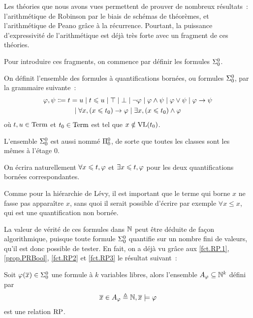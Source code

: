 Les théories que nous avons vues permettent de prouver de nombreux résultats~:
l'arithmétique de Robinson par le biais de schémas de théorèmes, et
l'arithmétique de Peano grâce à la récurrence. Pourtant, la puissance
d'expressivité de l'arithmétique est déjà très forte avec un fragment de ces
théories.

Pour introduire ces fragments, on commence par définir les formules
$\Sigma^0_{0}$.

\begin{definition}\label{def.Sigma0}
  On définit l'ensemble des formules à quantifications bornées, ou formules
  $\Sigma^0_{0}$, par la grammaire suivante~:
  \begin{multline*}
    \varFF,\varFP \inddefeq t = u \mid t \leq u \mid \top\mid \bot
    \mid \lnot \varFF
    \mid \varFF \land \varFP \mid \varFF \lor \varFP \mid \varFF \to \varFP\\
    \mid \forall x, (x \leq t_0) \to \varFF \mid
    \exists x, (x \leq t_0) \land \varFF
  \end{multline*}
  où $t,u \in \operatorname{Term}$ et $t_0\in \operatorname{Term}$ est tel que $x \notin \operatorname{VL}(t_0)$.

  L'ensemble $\Sigma^0_{0}$ est aussi nommé $\Pi^0_{0}$, de sorte que
  toutes les classes sont les mêmes à l'étage $0$.
\end{definition}

\begin{notation}
  On écrira naturellement $\forall x\leqslant t,\varphi$ et $\exists x\leqslant t,\varphi$
  pour les deux quantifications bornées correspondantes.
\end{notation}

\begin{remark}
  Comme pour la hiérarchie de Lévy, il est important que le terme
  qui borne $x$ ne fasse pas apparaître $x$, sans quoi il serait possible
  d'écrire par exemple $\forall x \leq x$, qui est une quantification non
  bornée.
\end{remark}

La valeur de vérité de ces formules dans $\mathbb N$ peut être déduite de façon
algorithmique, puisque toute formule $\Sigma^0_{0}$ quantifie sur un nombre
fini de valeurs, qu'il est donc possible de tester. En fait, on a déjà vu grâce
aux \cref{fct.RP.1}, \ref{prop.PRBool}, \ref{fct.RP2} et \ref{fct.RP3}
le résultat suivant~:

\begin{proposition}
  Soit $\varphi(\overline{x})\in \Sigma^0_{0}$ une formule à $k$ variables libres,
  alors l'ensemble $A_{\varphi}\subseteq \mathbb N^k$ défini par
  \[\overline{x} \in A_{\varphi} \triangleq \mathbb N,\overline{x} \models \varphi\]
  est une relation $\operatorname{RP}$.
\end{proposition}

